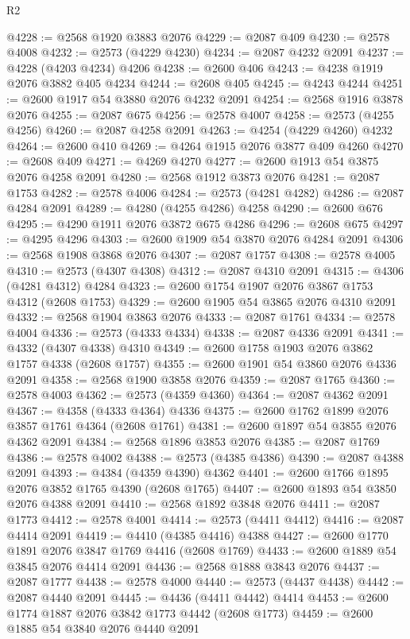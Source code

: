 \begin{lexlean}{R2}
\begin{coremodule}
@4228 := @2568 @1920 @3883 @2076
@4229 := @2087 @409
@4230 := @2578 @4008
@4232 := @2573 (@4229 @4230)
@4234 := @2087 @4232 @2091
@4237 := @4228 (@4203 @4234) @4206
@4238 := @2600 @406
@4243 := @4238 @1919 @2076 @3882 @405 @4234
@4244 := @2608 @405
@4245 := @4243 @4244
@4251 := @2600 @1917 @54 @3880 @2076 @4232 @2091
@4254 := @2568 @1916 @3878 @2076
@4255 := @2087 @675
@4256 := @2578 @4007
@4258 := @2573 (@4255 @4256)
@4260 := @2087 @4258 @2091
@4263 := @4254 (@4229 @4260) @4232
@4264 := @2600 @410
@4269 := @4264 @1915 @2076 @3877 @409 @4260
@4270 := @2608 @409
@4271 := @4269 @4270
@4277 := @2600 @1913 @54 @3875 @2076 @4258 @2091
@4280 := @2568 @1912 @3873 @2076
@4281 := @2087 @1753
@4282 := @2578 @4006
@4284 := @2573 (@4281 @4282)
@4286 := @2087 @4284 @2091
@4289 := @4280 (@4255 @4286) @4258
@4290 := @2600 @676
@4295 := @4290 @1911 @2076 @3872 @675 @4286
@4296 := @2608 @675
@4297 := @4295 @4296
@4303 := @2600 @1909 @54 @3870 @2076 @4284 @2091
@4306 := @2568 @1908 @3868 @2076
@4307 := @2087 @1757
@4308 := @2578 @4005
@4310 := @2573 (@4307 @4308)
@4312 := @2087 @4310 @2091
@4315 := @4306 (@4281 @4312) @4284
@4323 := @2600 @1754 @1907 @2076 @3867 @1753 @4312 (@2608 @1753)
@4329 := @2600 @1905 @54 @3865 @2076 @4310 @2091
@4332 := @2568 @1904 @3863 @2076
@4333 := @2087 @1761
@4334 := @2578 @4004
@4336 := @2573 (@4333 @4334)
@4338 := @2087 @4336 @2091
@4341 := @4332 (@4307 @4338) @4310
@4349 := @2600 @1758 @1903 @2076 @3862 @1757 @4338 (@2608 @1757)
@4355 := @2600 @1901 @54 @3860 @2076 @4336 @2091
@4358 := @2568 @1900 @3858 @2076
@4359 := @2087 @1765
@4360 := @2578 @4003
@4362 := @2573 (@4359 @4360)
@4364 := @2087 @4362 @2091
@4367 := @4358 (@4333 @4364) @4336
@4375 := @2600 @1762 @1899 @2076 @3857 @1761 @4364 (@2608 @1761)
@4381 := @2600 @1897 @54 @3855 @2076 @4362 @2091
@4384 := @2568 @1896 @3853 @2076
@4385 := @2087 @1769
@4386 := @2578 @4002
@4388 := @2573 (@4385 @4386)
@4390 := @2087 @4388 @2091
@4393 := @4384 (@4359 @4390) @4362
@4401 := @2600 @1766 @1895 @2076 @3852 @1765 @4390 (@2608 @1765)
@4407 := @2600 @1893 @54 @3850 @2076 @4388 @2091
@4410 := @2568 @1892 @3848 @2076
@4411 := @2087 @1773
@4412 := @2578 @4001
@4414 := @2573 (@4411 @4412)
@4416 := @2087 @4414 @2091
@4419 := @4410 (@4385 @4416) @4388
@4427 := @2600 @1770 @1891 @2076 @3847 @1769 @4416 (@2608 @1769)
@4433 := @2600 @1889 @54 @3845 @2076 @4414 @2091
@4436 := @2568 @1888 @3843 @2076
@4437 := @2087 @1777
@4438 := @2578 @4000
@4440 := @2573 (@4437 @4438)
@4442 := @2087 @4440 @2091
@4445 := @4436 (@4411 @4442) @4414
@4453 := @2600 @1774 @1887 @2076 @3842 @1773 @4442 (@2608 @1773)
@4459 := @2600 @1885 @54 @3840 @2076 @4440 @2091

\end{coremodule}
\end{lexlean}
